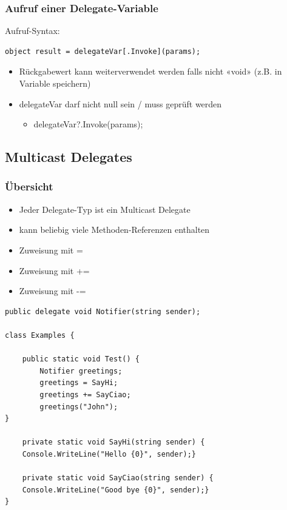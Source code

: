 \subsubsection{Aufruf einer Delegate-Variable}
Aufruf-Syntax:
\begin{lstlisting}
object result = delegateVar[.Invoke](params);
\end{lstlisting}

\begin{itemize}
    \item Rückgabewert kann weiterverwendet werden falls nicht «void» (z.B. in Variable speichern)
    \item delegateVar darf nicht null sein / muss geprüft werden
    \begin{itemize}
        \item delegateVar?.Invoke(params);
    \end{itemize}
\end{itemize}

\subsection{Multicast Delegates}

\subsubsection{Übersicht}
\begin{itemize}
    \item  Jeder Delegate-Typ ist ein Multicast Delegate
    \item kann beliebig viele Methoden-Referenzen enthalten
    \item Zuweisung mit =
    \item Zuweisung mit +=
    \item Zuweisung mit -=
\end{itemize}
\begin{lstlisting}
public delegate void Notifier(string sender);

class Examples {

    public static void Test() {
        Notifier greetings;
        greetings = SayHi;
        greetings += SayCiao;
        greetings("John");
}

    private static void SayHi(string sender) {
    Console.WriteLine("Hello {0}", sender);}

    private static void SayCiao(string sender) {
    Console.WriteLine("Good bye {0}", sender);}
}
\end{lstlisting}

